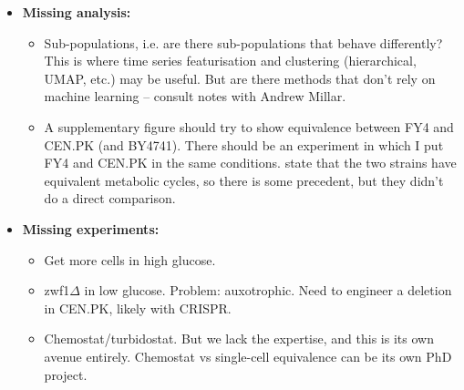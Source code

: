 \begin{itemize}
\item \textbf{Missing analysis:}
\begin{itemize}
\item Sub-populations, i.e. are there sub-populations that behave differently?  This is where time series featurisation and clustering (hierarchical, UMAP, etc.) may be useful.  But are there methods that don't rely on machine learning -- consult notes with Andrew Millar.
\item A supplementary figure should try to show equivalence between FY4 and CEN.PK (and BY4741).  There should be an experiment in which I put FY4 and CEN.PK in the same conditions. \cite{baumgartnerFlavinbasedMetabolicCycles2018} state that the two strains have equivalent metabolic cycles, so there is some precedent, but they didn't do a direct comparison.
\end{itemize}
\item \textbf{Missing experiments:}
\begin{itemize}
\item Get more cells in high glucose.
\item zwf1\(\Delta\) in low glucose.  Problem: auxotrophic.  Need to engineer a deletion in CEN.PK, likely with CRISPR.
\item Chemostat/turbidostat.  But we lack the expertise, and this is its own avenue entirely.  Chemostat vs single-cell equivalence can be its own PhD project.
\end{itemize}
\end{itemize}


